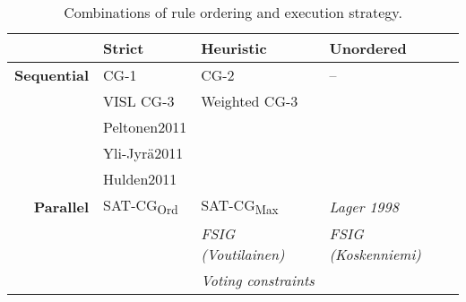


\def\satcgMax{SAT-CG\textsubscript{Max}}
\def\satcgOrd{SAT-CG\textsubscript{Ord}}
\def\noncg#1{{\em \color{gray} #1}}

\begin{table}[h!]
\centering

  \begin{tabular}{r | p{2.5cm} | p{3.5 cm} | p{3.5cm}}
           & \textbf{Strict} & \textbf{Heuristic} & \textbf{Unordered} \\ \hline
\textbf{Sequential}
           & CG-1 \cite{karlsson1990cgp}   
                             & CG-2 \cite{tapanainen1996} %
                                                  & --           \\ 
           & VISL CG-3 \cite{vislcg3}      
                             & Weighted CG-3 \cite{pirinen2015} & \\ 
           & Peltonen2011 \cite{peltonen2011}  &  &\\ %
           & Yli-Jyrä2011 \cite{yli-jyra2011cg_engine}  & & \\ 
           & Hulden2011 \cite{hulden2011cg_engine} \\ \hline
\textbf{Parallel}
           & \satcgOrd       & \satcgMax          & \noncg{Lager 1998 \cite{lager98}} \\ 
           &                 & \noncg{FSIG (Voutilainen) \cite{voutilainen1994designing}} 
                                                  & \noncg{FSIG (Koskenniemi) \cite{koskenniemi90}} \\
           &                 & \noncg{Voting constraints \cite{oflazer97votingconstraints}}  \\


  \end{tabular}
  \label{table:nelikentta}
  \caption{Combinations of rule ordering and execution strategy.}
\end{table}


